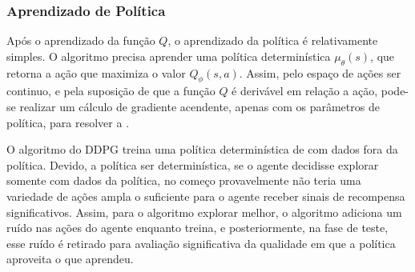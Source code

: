 
\subsubsection{Aprendizado de Política}

Após o aprendizado da função $Q$, o aprendizado da política é relativamente simples. O algoritmo precisa aprender uma política determinística $\mu_{\theta}(s)$, que retorna a ação que maximiza o valor $Q_{\phi}(s,a)$. Assim, pelo espaço de ações ser continuo, e pela suposição de que a função $Q$ é derivável em relação a ação, pode-se realizar um cálculo de gradiente acendente, apenas com os parâmetros de política, para resolver a .


O algoritmo do \acrshort{DDPG} treina uma política determinística de com dados fora da política. Devido, a política ser determinística, se o agente decidisse explorar somente com dados da política, no começo provavelmente não teria uma variedade de ações ampla o suficiente para o agente receber sinais de recompensa significativos. Assim, para o algoritmo explorar melhor, o algoritmo adiciona um ruído nas ações do agente enquanto treina, e posteriormente, na fase de teste, esse ruído é retirado para avaliação significativa da qualidade em que a política aproveita o que aprendeu.